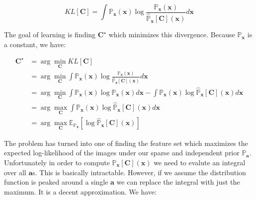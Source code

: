 \documentclass[12pt,a4paper,oneside,english]{UPBThesis}
\begin{document}
\begin{equation*}
KL[\textbf{C}] = \int{\mathbb{P}_\textbf{x}(\textbf{x}) \log{\frac{\mathbb{P}_\textbf{x}(\textbf{x})}{\hat{\mathbb{P}}_\textbf{x}[\textbf{C}](\textbf{x})}} d\textbf{x}}
\end{equation*}

The goal of learning is finding $\textbf{C}^\star$ which minimizes this divergence. Because $\mathbb{P}_\textbf{x}$ is a constant, we have:

\begin{align*}
\textbf{C}^\star & = \arg\min_\textbf{C} KL[\textbf{C}] \\
& = \arg\min_\textbf{C} \int{\mathbb{P}_\textbf{x}(\textbf{x}) \log{\frac{\mathbb{P}_\textbf{x}(\textbf{x})}{\hat{\mathbb{P}}_\textbf{x}[\textbf{C}](\textbf{x})}} d\textbf{x}} \\
& = \arg\min_\textbf{C} \int{\mathbb{P}_\textbf{x}(\textbf{x}) \log{\mathbb{P}_\textbf{x}(\textbf{x})} d\textbf{x}} - \int{\mathbb{P}_\textbf{x}(\textbf{x}) \log{\hat{\mathbb{P}}_\textbf{x}[\textbf{C}](\textbf{x})} d\textbf{x}} \\
& = \arg\max_\textbf{C} \int{\mathbb{P}_\textbf{x}(\textbf{x}) \log{\hat{\mathbb{P}}_\textbf{x}[\textbf{C}](\textbf{x})} d\textbf{x}} \\
& = \arg\max_\textbf{C} \mathbb{E}_{\mathbb{P}_\textbf{x}} [ \log{\hat{\mathbb{P}}_\textbf{x}[\textbf{C}](\textbf{x})} ]
\end{align*}

The problem has turned into one of finding the feature set which maximizes the expected log-likelihood of the images under our sparse and independent prior $\mathbb{P}_\textbf{a}$. Unfortunately in order to compute $\hat{\mathbb{P}}_\textbf{x}[\textbf{C}](\textbf{x})$ we need to evalute an integral over all $\textbf{a}$s. This is basically intractable. However, if we assume the distribution function is peaked around a single $\textbf{a}$ we can replace the integral with just the maximum. It is a decent approximation. We have:
\end{document}
